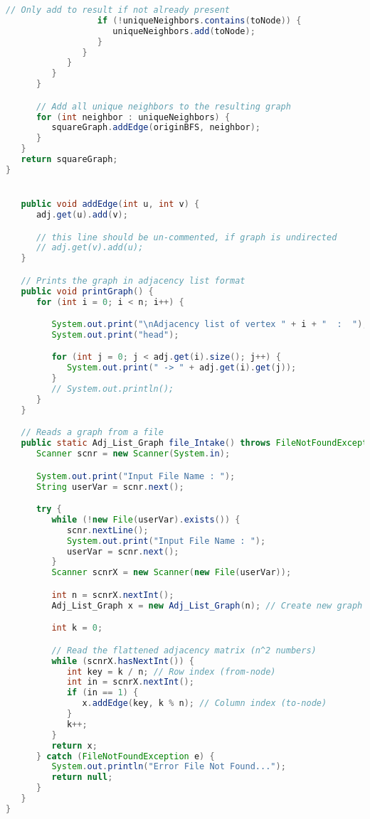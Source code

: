 \documentclass[11pt]{article}
\begin{document}
\begin{lstlisting}[language=Java]
                  // Only add to result if not already present
                  if (!uniqueNeighbors.contains(toNode)) {
                     uniqueNeighbors.add(toNode);
                  }
               }
            }
         }
      }

      // Add all unique neighbors to the resulting graph
      for (int neighbor : uniqueNeighbors) {
         squareGraph.addEdge(originBFS, neighbor);
      }
   }
   return squareGraph;
}


   public void addEdge(int u, int v) {
      adj.get(u).add(v);

      // this line should be un-commented, if graph is undirected
      // adj.get(v).add(u);
   }

   // Prints the graph in adjacency list format
   public void printGraph() {
      for (int i = 0; i < n; i++) {

         System.out.print("\nAdjacency list of vertex " + i + "  :  ");
         System.out.print("head");

         for (int j = 0; j < adj.get(i).size(); j++) {
            System.out.print(" -> " + adj.get(i).get(j));
         }
         // System.out.println();
      }
   }

   // Reads a graph from a file
   public static Adj_List_Graph file_Intake() throws FileNotFoundException {
      Scanner scnr = new Scanner(System.in);

      System.out.print("Input File Name : ");
      String userVar = scnr.next();

      try {
         while (!new File(userVar).exists()) {
            scnr.nextLine();
            System.out.print("Input File Name : ");
            userVar = scnr.next();
         }
         Scanner scnrX = new Scanner(new File(userVar));

         int n = scnrX.nextInt();
         Adj_List_Graph x = new Adj_List_Graph(n); // Create new graph

         int k = 0;

         // Read the flattened adjacency matrix (n^2 numbers)
         while (scnrX.hasNextInt()) {
            int key = k / n; // Row index (from-node)
            int in = scnrX.nextInt(); 
            if (in == 1) {
               x.addEdge(key, k % n); // Column index (to-node)
            }
            k++;
         }
         return x;
      } catch (FileNotFoundException e) {
         System.out.println("Error File Not Found...");
         return null;
      }
   }
}

\end{lstlisting}
\end{document}
